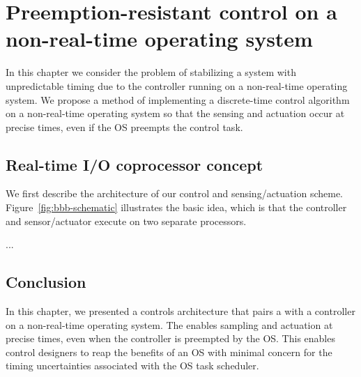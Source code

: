 
\chapter{Preemption-resistant control on a non-real-time operating system}
\label{chap:preemption}


In this chapter we consider the problem of stabilizing a system with unpredictable timing due to the controller running on a non-real-time operating system. 
We propose a method of implementing a discrete-time control
algorithm on a non-real-time operating system so that the sensing
and actuation occur at precise times, even if the OS preempts the
control task.


\section{Real-time I/O coprocessor concept}
\label{sec:rtiop} 


We first describe the architecture of our control and
sensing/actuation scheme. Figure~\ref{fig:bbb-schematic} illustrates
the basic idea, which is that the controller and sensor/actuator
execute on two separate processors. 

...


\section{Conclusion}
\label{sec:conclusion}

In this chapter, we presented a controls architecture that pairs a
\rtio{} with a controller on a non-real-time operating system. The
\RTU{} enables sampling and actuation at precise times, even when the
controller is preempted by the OS. This enables control designers to
reap the benefits of an OS with minimal concern for the timing
uncertainties associated with the OS task scheduler. 